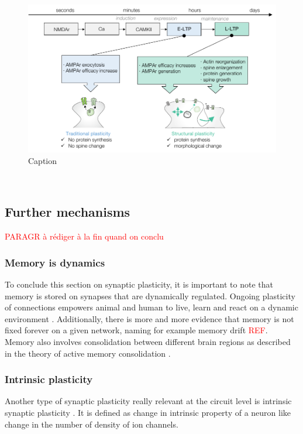 \begin{figure}[h!]
    \centering
    \includegraphics{latex/fig/Intro/SP_Summary.pdf}
    \caption{Caption}
    \label{fig:SP_Summary}
\end{figure}


\newpage
~\\
\newpage
\color{gray}
\subsection{Further mechanisms}

\textcolor{red}{PARAGR à rédiger à la fin  quand on conclu }
\subsubsection{Memory is dynamics}
To conclude this section on synaptic plasticity, it is important to note that memory is stored on synapses that are dynamically regulated. Ongoing plasticity of connections empowers animal and human to live, learn and react on a dynamic environment \citep{abraham_is_2019}. Additionally, there is more and more evidence that memory is not fixed forever on a given network, naming for example memory drift \textcolor{red}{REF}. Memory also involves consolidation between different brain regions as described in the theory of active memory consolidation \citep{born_sleep_2006}.

\subsubsection{Intrinsic plasticity}
Another type of synaptic plasticity really relevant at the circuit level is intrinsic synaptic plasticity \citep{daoudal_long-term_2003, debanne_plasticity_2019, sehgal_learning_2013}. It is defined as change in intrinsic property of a neuron like change in the number of density of ion channels.

